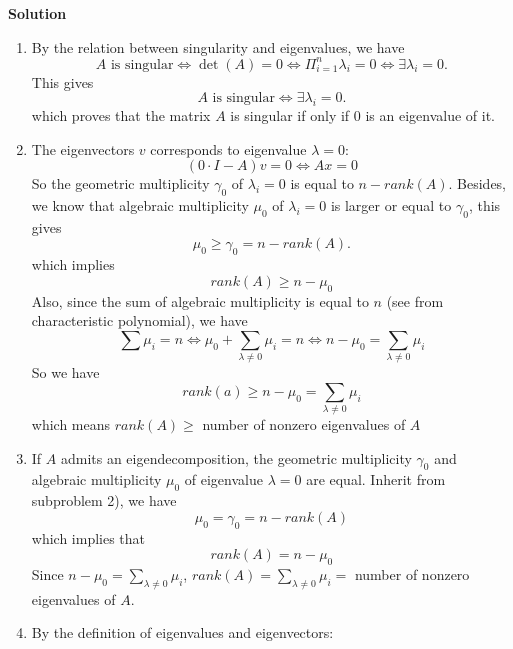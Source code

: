 \documentclass[english,onecolumn]{IEEEtran}
\begin{document}
\noindent
\textbf{Solution}
\begin{enumerate}
    \item By the relation between singularity and eigenvalues, we have
    	$$A \text{ is singular} \Leftrightarrow \det(A) =0 \Leftrightarrow \Pi_{i=1}^n \lambda_i = 0 \Leftrightarrow \exists \lambda_i = 0.$$
    	This gives 
    	$$A \text{ is singular} \Leftrightarrow \exists \lambda_i = 0.$$
    	which proves that the matrix $A$ is singular if only if 0 is an eigenvalue of it.
    \item The eigenvectors $v$ corresponds to eigenvalue $\lambda = 0$:
    	$$(0\cdot I - A)v = 0 \Leftrightarrow Ax = 0$$
    	So the geometric multiplicity $\gamma_0$ of $\lambda_i = 0$ is equal to $n-rank(A)$. Besides, we know that algebraic multiplicity $\mu_0$ of $\lambda_i = 0$ is larger or equal to $\gamma_0$, this gives
    	$$\mu_0 \ge \gamma_0 = n - rank(A).$$
    	which implies 
    	$$rank(A) \ge n - \mu_0$$
    	Also, since the sum of algebraic multiplicity is equal to $n$ (see from characteristic polynomial), we have  
    	$$\sum \mu_i = n \Leftrightarrow \mu_0 + \sum_{\lambda \ne 0} \mu_i = n \Leftrightarrow n-\mu_0 = \sum_{\lambda \ne 0} \mu_i$$  
    	So we have
    	$$rank(a) \ge n - \mu_0 = \sum_{\lambda \ne 0} \mu_i$$
    	which means $rank(A) \ge $ number of nonzero eigenvalues of $A$ 
    \item 
 	If $A$ admits an eigendecomposition, the geometric multiplicity $\gamma_0$ and algebraic multiplicity $\mu_0$ of eigenvalue $\lambda=0$ are equal. Inherit from subproblem 2), we have
 	$$\mu_0 = \gamma_0= n - rank(A)$$      
 	which implies that 
 	$$rank(A) = n- \mu_0$$
 	Since $n-\mu_0 = \sum_{\lambda \ne 0} \mu_i$, $rank(A)=\sum_{\lambda \ne 0} \mu_i=$ number of nonzero eigenvalues of $A$.
    \item
    	By the definition of eigenvalues and eigenvectors: 

\end{enumerate}
\end{document}
